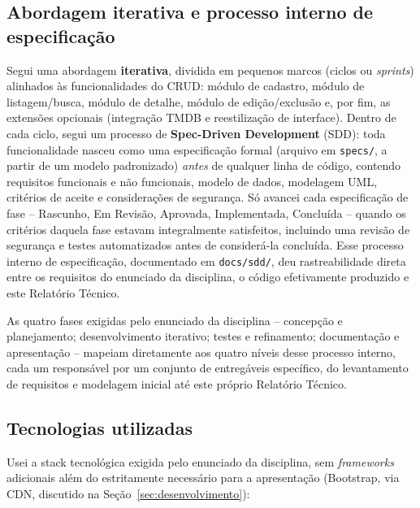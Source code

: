 \documentclass[12pt,a4paper]{article}
\begin{document}
\subsection{Abordagem iterativa e processo interno de especificação}

Segui uma abordagem \textbf{iterativa}, dividida em pequenos marcos (ciclos ou
\textit{sprints}) alinhados às funcionalidades do CRUD: módulo de cadastro, módulo de
listagem/busca, módulo de detalhe, módulo de edição/exclusão e, por fim, as extensões opcionais
(integração TMDB e reestilização de interface). Dentro de cada ciclo, segui um processo de
\textbf{Spec-Driven Development} (SDD): toda funcionalidade nasceu como uma especificação formal
(arquivo em \texttt{specs/}, a partir de um modelo padronizado) \textit{antes} de qualquer linha
de código, contendo requisitos funcionais e não funcionais, modelo de dados, modelagem UML,
critérios de aceite e considerações de segurança. Só avancei cada especificação de fase --
Rascunho, Em Revisão, Aprovada, Implementada, Concluída -- quando os critérios daquela fase
estavam integralmente satisfeitos, incluindo uma revisão de segurança e testes automatizados
antes de considerá-la concluída. Esse processo interno de especificação, documentado em
\texttt{docs/sdd/}, deu rastreabilidade direta entre os requisitos do enunciado da disciplina, o
código efetivamente produzido e este Relatório Técnico.

As quatro fases exigidas pelo enunciado da disciplina -- concepção e planejamento;
desenvolvimento iterativo; testes e refinamento; documentação e apresentação -- mapeiam
diretamente aos quatro níveis desse processo interno, cada um responsável por um conjunto de
entregáveis específico, do levantamento de requisitos e modelagem inicial até este próprio
Relatório Técnico.

\subsection{Tecnologias utilizadas}

Usei a stack tecnológica exigida pelo enunciado da disciplina, sem \textit{frameworks}
adicionais além do estritamente necessário para a apresentação (Bootstrap, via CDN, discutido na
Seção~\ref{sec:desenvolvimento}):
\end{document}
